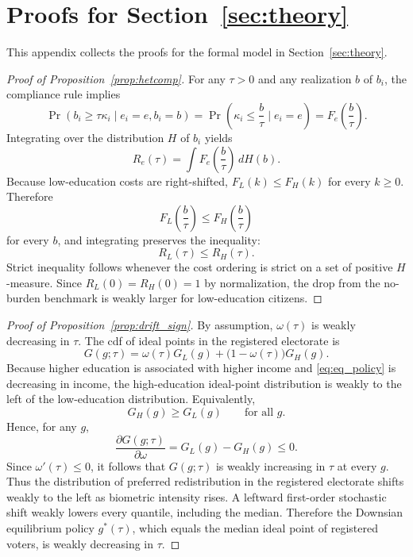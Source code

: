 \section{Proofs for Section~\ref{sec:theory}}
\label{app:model-proofs}

This appendix collects the proofs for the formal model in Section~\ref{sec:theory}.

\begin{proof}[Proof of Proposition~\ref{prop:hetcomp}]
For any $\tau>0$ and any realization $b$ of $b_i$, the compliance rule implies
\[
\Pr(b_i \geq \tau \kappa_i \mid e_i=e,b_i=b)=\Pr\!\left(\kappa_i \leq \frac{b}{\tau}\mid e_i=e\right)=F_e\!\left(\frac{b}{\tau}\right).
\]
Integrating over the distribution $H$ of $b_i$ yields
\[
R_e(\tau)=\int F_e\!\left(\frac{b}{\tau}\right)\,dH(b).
\]
Because low-education costs are right-shifted, $F_L(k)\leq F_H(k)$ for every $k\geq 0$. Therefore
\[
F_L\!\left(\frac{b}{\tau}\right)\leq F_H\!\left(\frac{b}{\tau}\right)
\]
for every $b$, and integrating preserves the inequality:
\[
R_L(\tau)\leq R_H(\tau).
\]
Strict inequality follows whenever the cost ordering is strict on a set of positive $H$-measure. Since $R_L(0)=R_H(0)=1$ by normalization, the drop from the no-burden benchmark is weakly larger for low-education citizens.
\end{proof}

\begin{proof}[Proof of Proposition~\ref{prop:drift_sign}]
By assumption, $\omega(\tau)$ is weakly decreasing in $\tau$. The cdf of ideal points in the registered electorate is
\[
G(g;\tau)=\omega(\tau)G_L(g)+\bigl(1-\omega(\tau)\bigr)G_H(g).
\]
Because higher education is associated with higher income and \eqref{eq:eq_policy} is decreasing in income, the high-education ideal-point distribution is weakly to the left of the low-education distribution. Equivalently,
\[
G_H(g)\geq G_L(g) \qquad \text{for all } g.
\]
Hence, for any $g$,
\[
\frac{\partial G(g;\tau)}{\partial \omega}=G_L(g)-G_H(g)\leq 0.
\]
Since $\omega'(\tau)\leq 0$, it follows that $G(g;\tau)$ is weakly increasing in $\tau$ at every $g$. Thus the distribution of preferred redistribution in the registered electorate shifts weakly to the left as biometric intensity rises. A leftward first-order stochastic shift weakly lowers every quantile, including the median. Therefore the Downsian equilibrium policy $g^\ast(\tau)$, which equals the median ideal point of registered voters, is weakly decreasing in $\tau$.
\end{proof}

